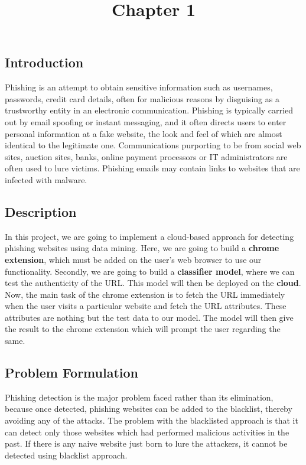\documentclass[12pt]{article}
\title{\textbf{Chapter 1}\vspace{-6ex}}
\begin{document}
\maketitle

\begin{center}
\section{Introduction}
\end{center}
Phishing is an attempt to obtain sensitive information such as usernames, passwords, credit card details, often for malicious reasons by disguising as a trustworthy entity in an electronic communication. Phishing is typically carried out by email spoofing or instant messaging, and it often directs users to enter personal information at a fake website, the look and feel of which are almost identical to the legitimate one. Communications purporting to be from social web sites, auction sites, banks, online payment processors or IT administrators are often used to lure victims. Phishing emails may contain links to websites that are infected with malware.\newline

\subsection{Description}
In this project, we are going to implement a cloud-based approach for detecting phishing websites using data mining. Here, we are going to build a \textbf{chrome extension}, which must be added on the user’s web browser to use our functionality. Secondly, we are going to build a \textbf{classifier model}, where we can test the authenticity of the URL. This model will then be deployed on the \textbf{cloud}. Now, the main task of the chrome extension is to fetch the URL immediately when the user visits a particular website and fetch the URL attributes. These attributes are nothing but the test data to our model. The model will then give the result to the chrome extension which will prompt the user regarding the same.

\subsection{Problem Formulation}
Phishing detection is the major problem faced rather than its elimination, because once detected, phishing websites can be added to the blacklist, thereby avoiding any of the attacks.\newline
The problem with the blacklisted approach is that it can detect only those websites which had performed malicious activities in the past. If there is any naive website just born to lure the attackers, it cannot be detected using blacklist approach.
\end{document}
